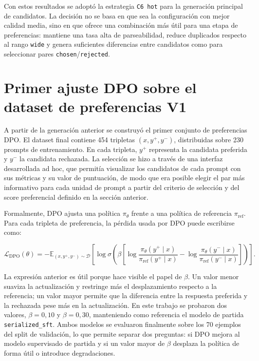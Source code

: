Con estos resultados se adoptó la estrategia \texttt{C6 hot} para la generación principal de
candidatos. La decisión no se basa en que sea la configuración con mejor calidad media, sino en que
ofrece una combinación más útil para una etapa de preferencias: mantiene una tasa alta de
parseabilidad, reduce duplicados respecto al rango \texttt{wide} y genera suficientes diferencias
entre candidatos como para seleccionar pares \texttt{chosen}/\texttt{rejected}.

\section{Primer ajuste DPO sobre el dataset de preferencias V1}
\label{sec:ch7_dpo_v1}

A partir de la generación anterior se construyó el primer conjunto de preferencias DPO. El dataset
final contiene 454 tripletas \((x,y^+,y^-)\), distribuidas sobre 230 prompts de entrenamiento. En cada tripleta,
\(y^+\) representa la candidata preferida y \(y^-\) la candidata rechazada. La selección se hizo a través de
una interfaz desarrollada ad hoc, que permitía visualizar los candidatos de cada prompt con sus métricas y
su valor de puntuación, de modo que era posible elegir el par más informativo para cada unidad de prompt a partir del
criterio de selección y del score preferencial definido en la sección anterior.

Formalmente, DPO ajusta una política \(\pi_\theta\) frente a una política de referencia
\(\pi_{\mathrm{ref}}\). Para cada tripleta de preferencia, la pérdida usada por DPO puede escribirse
como:

\[
\mathcal{L}_{\mathrm{DPO}}(\theta)=
-\mathbb{E}_{(x,y^+,y^-)\sim \mathcal{D}}
\left[
\log \sigma
\left(
\beta
\left[
\log \frac{\pi_\theta(y^+ \mid x)}{\pi_{\mathrm{ref}}(y^+ \mid x)}
-
\log \frac{\pi_\theta(y^- \mid x)}{\pi_{\mathrm{ref}}(y^- \mid x)}
\right]
\right)
\right].
\]

La expresión anterior es útil porque hace visible el papel de \(\beta\). Un valor menor suaviza la
actualización y restringe más el desplazamiento respecto a la referencia; un valor mayor permite que
la diferencia entre la respuesta preferida y la rechazada pese más en la actualización. En este
trabajo se probaron dos valores, \(\beta=0{,}10\) y \(\beta=0{,}30\), manteniendo como referencia el
modelo de partida \texttt{serialized\_sft}. Ambos modelos se evaluaron finalmente sobre los 70 ejemplos
del split de validación, lo que permite separar dos preguntas: si DPO mejora al modelo supervisado de
partida y si un valor mayor de \(\beta\) desplaza la política de forma útil o introduce degradaciones.

